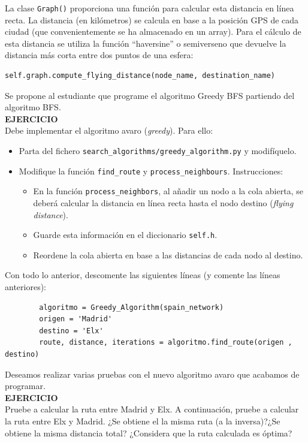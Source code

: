 \documentclass{article}
\begin{document}
La clase \texttt{Graph()} proporciona una función para calcular esta distancia en línea recta. La distancia (en kilómetros) se calcula en base a la posición GPS de cada ciudad (que convenientemente se ha almacenado en un array). Para el cálculo de esta distancia se utiliza la función ``haversine'' o semiverseno que devuelve la distancia más corta entre dos puntos de una esfera:
\begin{verbatim}    
self.graph.compute_flying_distance(node_name, destination_name)
\end{verbatim}


\begin{exercise}
Se propone al estudiante que programe el algoritmo Greedy BFS partiendo del algoritmo BFS.\\

\textbf{EJERCICIO}\\
    Debe implementar el algoritmo avaro (\textit{greedy}). Para ello:
    \begin{itemize}
        \item Parta del fichero \texttt{search\_algorithms/greedy\_algorithm.py} y modifíquelo. 
        \item Modifique la función \texttt{find\_route} y \texttt{process\_neighbours}. Instrucciones: 
        \begin{itemize}
            \item En la función \texttt{process\_neighbors}, al añadir un nodo a la cola abierta, se deberá calcular la distancia en línea recta hasta el nodo destino (\textit{flying distance}). 
            \item Guarde esta información en el diccionario \texttt{self.h}.
            \item Reordene la cola abierta en base a las distancias de cada nodo al destino.
        \end{itemize}
    \end{itemize}  
    Con todo lo anterior, descomente las siguientes líneas (y comente las líneas anteriores):
    \begin{verbatim}
        algoritmo = Greedy_Algorithm(spain_network)
        origen = 'Madrid'
        destino = 'Elx'
        route, distance, iterations = algoritmo.find_route(origen , destino)
    \end{verbatim}
\end{exercise}

\begin{exercise}
    Deseamos realizar varias pruebas con el nuevo algoritmo avaro que acabamos de programar.\\
    
    \textbf{EJERCICIO}\\
    Pruebe a calcular la ruta entre Madrid y Elx. 
    A continuación, pruebe a calcular la ruta entre Elx y Madrid. ¿Se obtiene el la misma ruta (a la inversa)?¿Se obtiene la misma distancia total? ¿Considera que la ruta calculada es óptima?
\end{exercise}
\end{document}
